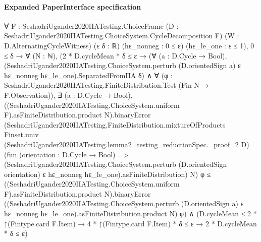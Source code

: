 \documentclass[10pt]{article}
\begin{document}
\paragraph{Expanded PaperInterface specification}
\begin{ReviewVerbatim}
∀ {F : SeshadriUgander2020IIATesting.ChoiceFrame} (D : SeshadriUgander2020IIATesting.ChoiceSystem.CycleDecomposition F)
  (W : D.AlternatingCycleWitness) (ε δ : ℝ) (hε_nonneg : 0 ≤ ε) (hε_le_one : ε ≤ 1),
  0 ≤ δ →
    ∀ (N : ℕ),
      (2 * D.cycleMean * δ ≤ ε →
          (∀ (a : D.Cycle → Bool),
              (SeshadriUgander2020IIATesting.ChoiceSystem.perturb (D.orientedSign a) ε hε_nonneg
                    hε_le_one).SeparatedFromIIA
                δ) ∧
            ∀ (φ : SeshadriUgander2020IIATesting.FiniteDistribution.Test (Fin N → F.Observation)),
              ∃ (a : D.Cycle → Bool),
                ((SeshadriUgander2020IIATesting.ChoiceSystem.uniform F).asFiniteDistribution.product N).binaryError
                    (SeshadriUgander2020IIATesting.FiniteDistribution.mixtureOfProducts Finset.univ
                      (SeshadriUgander2020IIATesting.lemma2_testing_reductionSpec._proof_2 D)
                      (fun (orientation : D.Cycle → Bool) =>
                        (SeshadriUgander2020IIATesting.ChoiceSystem.perturb (D.orientedSign orientation) ε hε_nonneg
                            hε_le_one).asFiniteDistribution)
                      N)
                    φ ≤
                  ((SeshadriUgander2020IIATesting.ChoiceSystem.uniform F).asFiniteDistribution.product N).binaryError
                    ((SeshadriUgander2020IIATesting.ChoiceSystem.perturb (D.orientedSign a) ε hε_nonneg
                            hε_le_one).asFiniteDistribution.product
                      N)
                    φ) ∧
        (D.cycleMean ≤ 2 * ↑(Fintype.card F.Item) → 4 * ↑(Fintype.card F.Item) * δ ≤ ε → 2 * D.cycleMean * δ ≤ ε)
\end{ReviewVerbatim}
\end{document}
